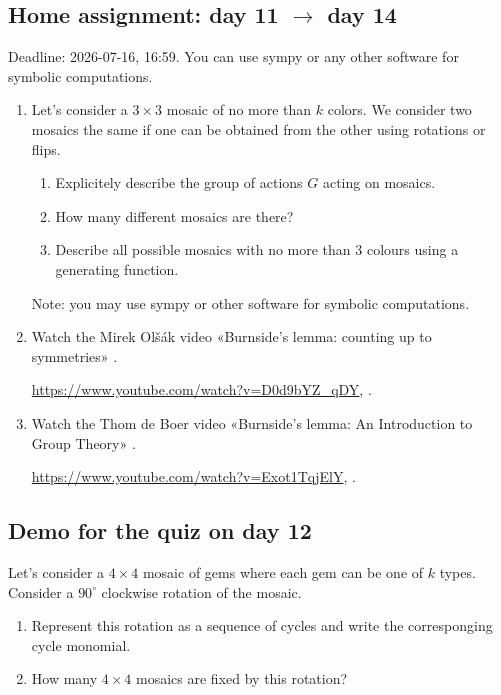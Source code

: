 \documentclass[12pt]{article}
\begin{document}





\subsection*{Home assignment: day 11 $\to$ day 14}

Deadline: 2026-07-16, 16:59. 
You can use sympy or any other software for symbolic computations.

\begin{enumerate}
    \item Let's consider a $3 \times 3$ mosaic of no more than $k$ colors. 
    We consider two mosaics the same if one can be obtained from the other using rotations or flips. 
    
        \begin{enumerate}[label=\alph*)]
        \item Explicitely describe the group of actions $G$ acting on mosaics. 
        \item How many different mosaics are there?
        \item Describe all possible mosaics with no more than $3$ colours using a generating function.
    \end{enumerate}
    Note: you may use sympy or other software for symbolic computations.

    \item Watch the Mirek Olšák video «Burnside's lemma: counting up to symmetries» \cite{olsak2020burnside}.

    \url{https://www.youtube.com/watch?v=D0d9bYZ_qDY},
    .

    \item Watch the Thom de Boer video «Burnside's lemma: An Introduction to Group Theory» \cite{boer2023burnside}.

    \url{https://www.youtube.com/watch?v=Exot1TqjElY},
    .


\end{enumerate}


\subsection*{Demo for the quiz on day 12}

Let's consider a $4 \times 4$ mosaic of gems where each gem can be one of $k$ types. 
Consider a $90^{\circ}$ clockwise rotation of the mosaic.
\begin{enumerate}
    \item Represent this rotation as a sequence of cycles and write the corresponging cycle monomial. 
    \item How many $4\times 4$ mosaics are fixed by this rotation?
\end{enumerate}
\end{document}
